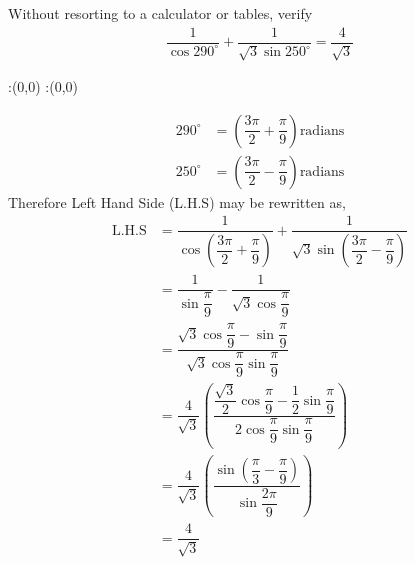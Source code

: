 

\question[5] Without resorting to a calculator or tables, verify
\begin{align}
  \dfrac{1}{\cos 290^\circ}+\dfrac{1}{\sqrt{3}\sin 250^\circ} 
    = \dfrac{4}{\sqrt{3}} \nonumber
\end{align}


\ifprintanswers
  \begin{marginfigure}
      :(0,0)
      :(0,0)
    \figdrawbegin{}
      \figdrawline [100,101]
    \figdrawend
    \figvisu{\figBoxA}{}{%
    }
    \centerline{\box\figBoxA}
  \end{marginfigure}
\fi 


\begin{solution}[\fullpage]
  \begin{align}     
    290^\circ &= \left(\dfrac{3\pi}{2}+\dfrac{\pi}{9}\right) 
      \text{radians} \\
    250^\circ &= \left(\dfrac{3\pi}{2}-\dfrac{\pi}{9}\right) 
      \text{radians}
  \end{align}
  Therefore Left Hand Side (L.H.S) may be rewritten as,
  \begin{align}
    \text{L.H.S} &= \dfrac{1}{\cos(\dfrac{3\pi}{2}+\dfrac{\pi}{9})}+
      				  \dfrac{1}{\sqrt{3}
      				    \sin(\dfrac{3\pi}{2}-\dfrac{\pi}{9})} \\
      		     &= \dfrac{1}{\sin\dfrac{\pi}{9}}-
      				  \dfrac{1}{\sqrt{3}\cos\dfrac{\pi}{9}} \\
      		     &= \dfrac{\sqrt{3}\cos\dfrac{\pi}{9}-\sin\dfrac{\pi}{9}}
      		              {\sqrt{3}\cos\dfrac{\pi}{9}\sin\dfrac{\pi}{9}} \\
      		     &= \dfrac{4}{\sqrt{3}}\left(
      		          \dfrac{\dfrac{\sqrt{3}}{2}\cos\dfrac{\pi}{9}-
      		                         \dfrac{1}{2}\sin\dfrac{\pi}{9}}
            		               {2\cos\dfrac{\pi}{9}
            		                 \sin\dfrac{\pi}{9}}\right) \\
      		     &= \dfrac{4}{\sqrt{3}}\left(
      		          \dfrac{\sin(\dfrac{\pi}{3}-\dfrac{\pi}{9})}
      		                {\sin\dfrac{2\pi}{9}}\right) \\
      		     &= \dfrac{4}{\sqrt{3}}
  \end{align}
\end{solution}
